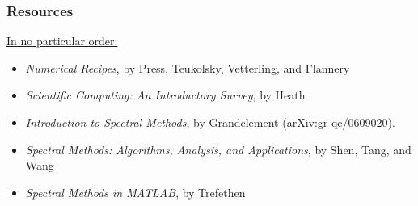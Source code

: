 \documentclass[]{beamer}
\begin{document}
% 
% 

\begin{frame}
  \frametitle{Resources}
  {\Large\underline{In no particular order:}}
  \vspace{1cm}
  \begin{itemize}
    \item \textit{Numerical Recipes}, by Press, Teukolsky, Vetterling, and Flannery
    \item \textit{Scientific Computing: An Introductory Survey}, by Heath
    \item \textit{Introduction to Spectral Methods}, by Grandclement (\href{http://arxiv.org/abs/gr-qc/0609020}{arXiv:gr-qc/0609020}).
    \item \textit{Spectral Methods: Algorithms, Analysis, and Applications}, by Shen, Tang, and Wang
    \item \textit{Spectral Methods in MATLAB}, by Trefethen
  \end{itemize}
\end{frame}
\end{document}
